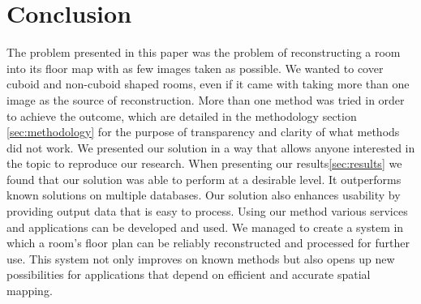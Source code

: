 \section{Conclusion}
\label{sec:conclusion}
The problem presented in this paper was the problem of reconstructing a room into its floor map with as few images taken as possible. We wanted to cover cuboid and non-cuboid shaped rooms, even if it came with taking more than one image as the source of reconstruction. More than one method was tried in order to achieve the outcome, which are detailed in the methodology section \ref{sec:methodology} for the purpose of transparency and clarity of what methods did not work. We presented our solution in a way that allows anyone interested in the topic to reproduce our research. When presenting our results\ref{sec:results} we found that our solution was able to perform at a desirable level. It outperforms known solutions on multiple databases. Our solution also enhances usability by providing output data that is easy to process. Using our method various services and applications can be developed and used. We managed to create a system in which a room's floor plan can be reliably reconstructed and processed for further use. This system not only improves on known methods but also opens up new possibilities for applications that depend on efficient and accurate spatial mapping.